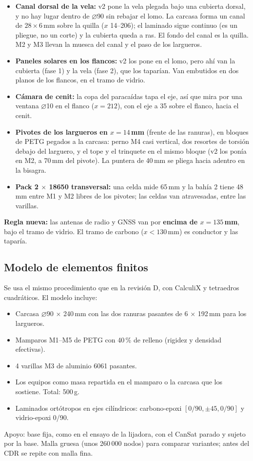 \documentclass[10pt,a4paper]{article}
\newcommand{\diam}{\ensuremath{\varnothing}}
\newcommand{\pend}[1]{\textcolor{rojo}{\bfseries #1}}
\begin{document}
\begin{itemize}
\item \textbf{Canal dorsal de la vela:} v2 pone la vela plegada bajo una cubierta dorsal, y no hay lugar dentro de \diam90 sin rebajar el lomo. La carcasa forma un canal de $28 \times 6$\,mm sobre la quilla ($x$ 14--206); el laminado sigue continuo (es un pliegue, no un corte) y la cubierta queda a ras. El fondo del canal es la quilla. M2 y M3 llevan la muesca del canal y el paso de los largueros.
\item \textbf{Paneles solares en los flancos:} v2 los pone en el lomo, pero ahí van la cubierta (fase 1) y la vela (fase 2), que los taparían. Van embutidos en dos planos de los flancos, en el tramo de vidrio.
\item \textbf{Cámara de cenit:} la copa del paracaídas tapa el eje, así que mira por una ventana \diam10 en el flanco ($x = 212$), con el eje a 35\textdegree{} sobre el flanco, hacia el cenit.
\item \textbf{Pivotes de los largueros en $x = 14$\,mm} (frente de las ranuras), en bloques de PETG pegados a la carcasa: perno M4 casi vertical, dos resortes de torsión debajo del larguero, y el tope y el trinquete en el mismo bloque (v2 los ponía en M2, a 70\,mm del pivote). La puntera de 40\,mm se pliega hacia adentro en la bisagra.
\item \textbf{Pack 2 $\times$ 18650 transversal:} una celda mide 65\,mm y la bahía 2 tiene 48\,mm entre M1 y M2 libres de los pivotes; las celdas van atravesadas, entre las varillas.
\end{itemize}

\pend{Regla nueva:} las antenas de radio y GNSS van por \textbf{encima de $x = 135$\,mm}, bajo el tramo de vidrio. El tramo
de carbono ($x < 130$\,mm) es conductor y las taparía.

\subsection{Modelo de elementos finitos}
Se usa el mismo procedimiento que en la revisión D, con CalculiX y tetraedros cuadráticos. El modelo incluye:
\begin{itemize}
\item Carcasa \diam90 $\times$ 240\,mm con las dos ranuras pasantes de 6 $\times$ 192\,mm para los largueros.
\item Mamparos M1--M5 de PETG con 40\,\% de relleno (rigidez y densidad efectivas).
\item 4 varillas M3 de aluminio 6061 pasantes.
\item Los equipos como masa repartida en el mamparo o la carcasa que los sostiene. Total: 500\,g.
\item Laminados ortótropos en ejes cilíndricos: carbono-epoxi $[0/90,\pm45,0/90]$ y vidrio-epoxi 0/90.
\end{itemize}
Apoyo: base fija, como en el ensayo de la lijadora, con el CanSat parado y sujeto por la base. Malla gruesa (unos 260\,000 nodos)
para comparar variantes; antes del CDR se repite con malla fina.
\end{document}
